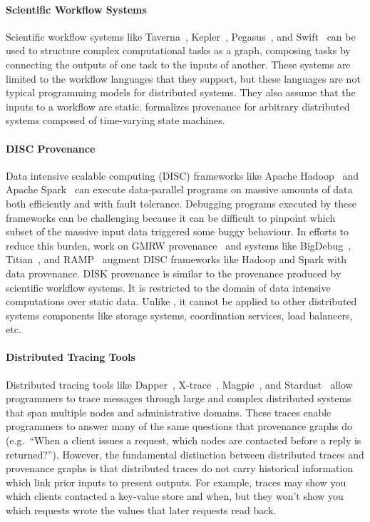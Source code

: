 \paragraph{Scientific Workflow Systems}
Scientific workflow systems like Taverna~\cite{wolstencroft2013taverna},
Kepler~\cite{altintas2006provenance}, Pegasus~\cite{kim2008provenance}, and
Swift~\cite{wozniak2013swift} can be used to structure complex computational
tasks as a graph, composing tasks by connecting the outputs of one task to the
inputs of another. These systems are limited to the workflow languages that
they support, but these languages are not typical programming models for
distributed systems. They also assume that the inputs to a workflow are
static.  \watprovenance{} formalizes provenance for arbitrary distributed
systems composed of time-varying state machines.

\paragraph{DISC Provenance}
Data intensive scalable computing (DISC) frameworks like Apache
Hadoop~\cite{shvachko2010hadoop} and Apache Spark~\cite{zaharia2010spark} can
execute data-parallel programs on massive amounts of data both efficiently and
with fault tolerance. Debugging programs executed by these frameworks can be
challenging because it can be difficult to pinpoint which subset of the massive
input data triggered some buggy behaviour. In efforts to reduce this burden,
work on GMRW provenance~\cite{ikeda2011provenance} and systems like
BigDebug~\cite{gulzar2016bigdebug}, Titian~\cite{interlandi2015titian}, and
RAMP~\cite{park2011ramp} augment DISC frameworks like Hadoop and Spark with
data provenance. DISK provenance is similar to the provenance produced by
scientific workflow systems. It is restricted to the domain of data intensive
computations over static data.  Unlike \watprovenance{}, it cannot be applied
to other distributed systems components like storage systems, coordination
services, load balancers, etc.

\paragraph{Distributed Tracing Tools}
Distributed tracing tools like Dapper~\cite{sigelman2010dapper},
X-trace~\cite{fonseca2007x}, Magpie~\cite{barham2003magpie}, and
Stardust~\cite{thereska2006stardust} allow programmers to trace messages
through large and complex distributed systems that span multiple nodes and
administrative domains. These traces enable programmers to answer many of the
same questions that provenance graphs do (e.g.\ ``When a client issues a
request, which nodes are contacted before a reply is returned?''). However, the
fundamental distinction between distributed traces and provenance graphs is
that distributed traces do not carry historical information which link prior
inputs to present outputs. For example, traces may show you which clients
contacted a key-value store and when, but they won't show you which requests
wrote the values that later requests read back.
